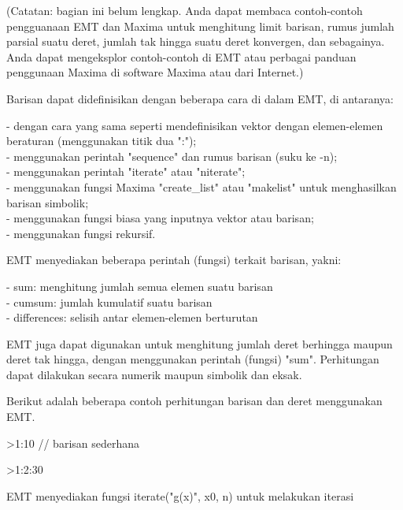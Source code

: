 \documentclass[a4paper,10pt]{article}
\begin{document}
\begin{eulernotebook}
\begin{eulercomment}
\begin{eulercomment}
\begin{eulercomment}
\begin{eulercomment}
\begin{eulercomment}
(Catatan: bagian ini belum lengkap. Anda dapat membaca contoh-contoh pengguanaan EMT dan
Maxima untuk menghitung limit barisan, rumus jumlah parsial suatu deret, jumlah tak hingga
suatu deret konvergen, dan sebagainya. Anda dapat mengeksplor contoh-contoh di EMT atau
perbagai panduan penggunaan Maxima di software Maxima atau dari Internet.)

Barisan dapat didefinisikan dengan beberapa cara di dalam EMT, di antaranya:

- dengan cara yang sama seperti mendefinisikan vektor dengan elemen-elemen beraturan
(menggunakan titik dua ":");\\
- menggunakan perintah "sequence" dan rumus barisan (suku ke -n);\\
- menggunakan perintah "iterate" atau "niterate";\\
- menggunakan fungsi Maxima "create\_list" atau "makelist" untuk menghasilkan barisan
simbolik;\\
- menggunakan fungsi biasa yang inputnya vektor atau barisan;\\
- menggunakan fungsi rekursif.

EMT menyediakan beberapa perintah (fungsi) terkait barisan, yakni:

- sum: menghitung jumlah semua elemen suatu barisan\\
- cumsum: jumlah kumulatif suatu barisan\\
- differences: selisih antar elemen-elemen berturutan

EMT juga dapat digunakan untuk menghitung jumlah deret berhingga maupun deret tak hingga,
dengan menggunakan perintah (fungsi) "sum". Perhitungan dapat dilakukan secara numerik
maupun simbolik dan eksak.

Berikut adalah beberapa contoh perhitungan barisan dan deret menggunakan EMT.
\end{eulercomment}
\begin{eulerprompt}
>1:10 // barisan sederhana
\end{eulerprompt}
\begin{euleroutput}
  [1,  2,  3,  4,  5,  6,  7,  8,  9,  10]
\end{euleroutput}
\begin{eulerprompt}
>1:2:30
\end{eulerprompt}
\begin{euleroutput}
  [1,  3,  5,  7,  9,  11,  13,  15,  17,  19,  21,  23,  25,  27,  29]
\end{euleroutput}
\begin{eulercomment}
EMT menyediakan fungsi iterate("g(x)", x0, n) untuk melakukan iterasi


\end{eulercomment}
\end{eulercomment}
\end{eulercomment}
\end{eulercomment}
\end{eulercomment}
\end{eulernotebook}
\end{document}
